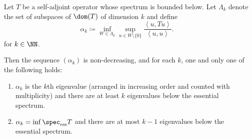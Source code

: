 \documentclass[oneside,reqno,letterpaper]{amsart}
\newcommand{\essspec}{\spec_{\text{ess}}}
\begin{document}
\begin{theorem}
  Let \(T\) be a self-adjoint operator whose spectrum is bounded below. 
  Let \(\Lambda_k\) denote the set of subspaces of \(\dom(T)\) of dimension \(k\) and define 
  \[
    \alpha_k \coloneqq \inf_{W \in \Lambda_k} \sup_{u \in W \setminus \{0\}} \frac{\left< u, Tu \right>}{\left< u, u \right>} . 
  \] 
  for \(k \in \NN\). 

  Then the sequence \((\alpha_k)\) is non-decreasing, and for each \(k\), one and only one of the following holds:
  \begin{enumerate}[label=(\alph*)]
    \item \(\alpha_k\) is the \(k\)th eigenvalue (arranged in increasing order and counted with multiplicity) and there are at least \(k\) eigenvalues below the essential spectrum. 
    \item \(\alpha_k = \inf \essspec T\) and there are at most \(k - 1\) eigenvalues below the essential spectrum. 
  \end{enumerate}
\end{theorem}
\end{document}
